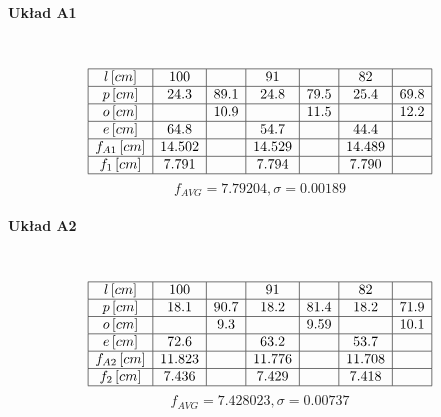 \documentclass[a4paper, 11pt]{article}
\begin{document}

\paragraph{Układ A1}\label{par:paragraph_name} %
\mbox{} \\
\[
	\begin{array}{|c|c|c|c|c|c|c|c|c|}
		\hline
		l \, [cm]      & 100    & ~    & 91     & ~    & 82     & ~    \\ \hline
		p \, [cm]      & 24.3   & 89.1 & 24.8   & 79.5 & 25.4   & 69.8 \\ \hline
		o \, [cm]      & ~      & 10.9 & ~      & 11.5 & ~      & 12.2 \\ \hline
		e \, [cm]      & 64.8   & ~    & 54.7   & ~    & 44.4   & ~    \\ \hline
		f_{A1} \, [cm] & 14.502 & ~    & 14.529 & ~    & 14.489 & ~    \\ \hline
		f_1 \, [cm]    & 7.791  & ~    & 7.794  & ~    & 7.790  & ~    \\ \hline
	\end{array}
\]
$$f_{AVG} = 7.79204 , \sigma = 0.00189 $$


\paragraph{Układ A2}\label{par:paragraph_name} %
\mbox{} \\
\[
	\begin{array}{|c|c|c|c|c|c|c|c|c|}
		\hline
		l \, [cm]      & 100    & ~    & 91     & ~    & 82     & ~    \\ \hline
		p \, [cm]      & 18.1   & 90.7 & 18.2   & 81.4 & 18.2   & 71.9 \\ \hline
		o \, [cm]      & ~      & 9.3  & ~      & 9.59 & ~      & 10.1 \\ \hline
		e \, [cm]      & 72.6   & ~    & 63.2   & ~    & 53.7   & ~    \\ \hline
		f_{A2} \, [cm] & 11.823 & ~    & 11.776 & ~    & 11.708 & ~    \\ \hline
		f_2 \, [cm]    & 7.436  & ~    & 7.429  & ~    & 7.418  & ~    \\ \hline
	\end{array}
\]
$$f_{AVG} =  7.428023 , \sigma = 0.00737 $$

\end{document}
